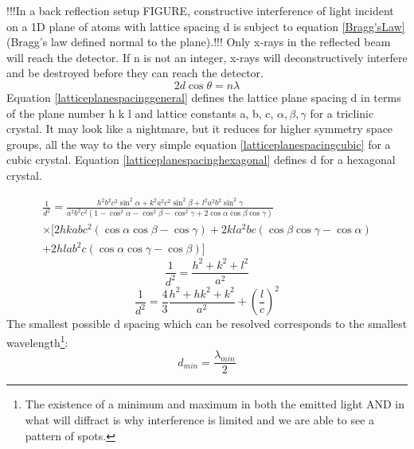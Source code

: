 !!!In a back reflection setup FIGURE, constructive interference of light incident on a 1D plane of atoms with lattice spacing d is subject to equation \ref{Bragg'sLaw} (Bragg’s law defined normal to the plane).!!! Only x-rays in the reflected beam will reach the detector. If n is not an integer, x-rays will deconstructively interfere and be destroyed before they can reach the detector.
\begin{equation}
    2d\cos{\theta} = n\lambda
    \label{Bragg'sLaw}
\end{equation}
Equation \ref{latticeplanespacinggeneral} defines the lattice plane spacing d in terms of the plane number h k l and lattice constants a, b, c, $\alpha, \beta, \gamma$ for a triclinic crystal. It may look like a nightmare, but it reduces for higher symmetry space groups, all the way to the very simple equation \ref{latticeplanespacingcubic} for a cubic crystal. Equation \ref{latticeplanespacinghexagonal} defines d for a hexagonal crystal.

\begin{multline}
    \frac{1}{d^2}=\frac{h^2b^2c^2\sin^2{\alpha}+k^2a^2c^2\sin^2{\beta}+l^2a^2b^2\sin^2{\gamma}}{a^2b^2c^2(1-\cos^2{\alpha}-\cos^2{\beta}-\cos^2{\gamma}+2\cos{\alpha}\cos{\beta}\cos{\gamma})}\\\times[2hkabc^2(\cos{\alpha}\cos{\beta}-\cos{\gamma})+2kla^2bc(\cos{\beta}\cos{\gamma}-\cos{\alpha})\\+2hlab^2c(\cos{\alpha}\cos{\gamma}-\cos{\beta})]
    \label{latticeplanespacinggeneral}
    \end{multline}
\begin{equation}
    \frac{1}{d^2}=\frac{h^2+k^2+l^2}{a^2}
    \label{latticeplanespacingcubic}
\end{equation}
\begin{equation}
    \frac{1}{d^2}=\frac{4}{3}\frac{h^2+hk^2+k^2}{a^2}+(\frac{l}{c})^2
    \label{latticeplanespacinghexagonal}
\end{equation}
The smallest possible d spacing which can be resolved corresponds to the smallest wavelength\footnote{The existence of a minimum and maximum in both the emitted light AND in what will diffract is why interference is limited and we are able to see a pattern of spots.}:
\begin{equation}
    d_{min}=\frac{\lambda_{min}}{2}
    \label{minspacing}
\end{equation}
